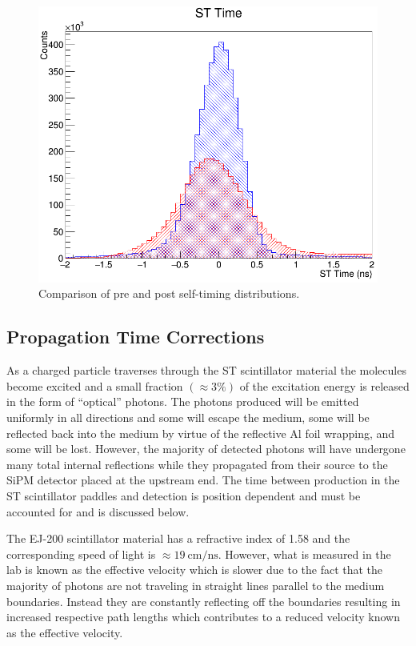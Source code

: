 	\begin{figure}[!htb]
		\centering
		\includegraphics[width=1.0\columnwidth]{calibration/figs/st_time_overlay_ch15}
		\caption{Comparison of pre and post self-timing distributions.}
		\label{fig:sttimeoverlaych15}
	\end{figure}

\subsection{Propagation Time Corrections} \label{sec:calib_ptc}

As a charged particle traverses through the ST scintillator material the molecules become excited and a small fraction $(\approx 3\%)$ \cite{pdg_2012} of the excitation energy is released in the form of ``optical'' photons.  The photons produced will be emitted uniformly in all directions and some will escape the medium, some will be reflected back into the medium by virtue of the reflective Al foil wrapping, and some will be lost.  However, the majority of detected  photons will have undergone many total internal reflections while they propagated from their source to the SiPM detector placed at the upstream end.  The time between production in the ST scintillator paddles and detection is position dependent and must be accounted for and is discussed below.

The EJ-200 scintillator material has a refractive index of 1.58 \cite{ej200_specs} and the corresponding speed of light is $\approx \mathrm{19\ cm/ns}$.  However, what is measured in the lab is known as the effective velocity which is slower due to the fact that the majority of photons are not traveling in straight lines parallel to the medium boundaries.  Instead they are constantly reflecting off the boundaries resulting in increased respective path lengths which contributes to a reduced velocity known as the effective velocity.  

